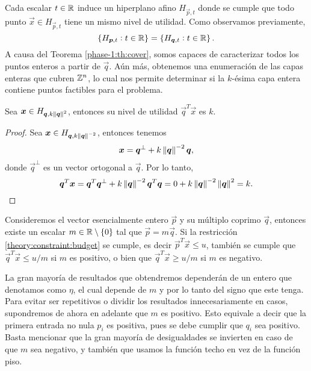 Cada escalar $t \in \mathbb{R}$ induce un hiperplano afino $H_{\vec{p}, t}$ donde se cumple que todo punto
$\vec{x} \in H_{\vec{p}, t}$ tiene un mismo nivel de utilidad. Como observamos previamente,
\begin{equation*}
	\left \lbrace H_{\boldsymbol{p}, t} \vcentcolon t \in \mathbb{R} \right\rbrace
	=
	\left \lbrace H_{\boldsymbol{q}, t} \vcentcolon t \in \mathbb{R} \right\rbrace.
\end{equation*}
A causa del Teorema \ref{phase-1:th:cover}, somos capaces de caracterizar todos los puntos enteros a
partir de $\vec{q}$. Aún más, obtenemos una enumeración de las capas enteras que cubren $\mathbb{Z}^n$, lo
cual nos permite determinar si la $k$-ésima capa entera contiene puntos factibles para el problema.

\begin{lemma}
	\label{theory:lemma:utility}
	Sea $\boldsymbol{x} \in H_{\boldsymbol{q}, k\left\lVert \boldsymbol{q} \right\rVert^2}$, entonces su nivel de utilidad
	$\vec{q}^T\vec{x}$ es $k$.
\end{lemma}
\begin{proof}
	Sea $\boldsymbol{x} \in H_{\boldsymbol{q}, k\left\lVert \boldsymbol{q} \right\rVert^{-2}}$, entonces tenemos
	\begin{equation*}
		\boldsymbol{x} = \boldsymbol{q}^{\perp} + k\left\lVert \boldsymbol{q} \right\rVert^{-2}\boldsymbol{q},
	\end{equation*}
	donde $\vec{q}^{\perp}$ es un vector ortogonal a $\vec{q}$. Por lo tanto,
	\begin{equation*}
		\boldsymbol{q}^T\boldsymbol{x} = \boldsymbol{q}^T\boldsymbol{q}^{\perp} + k\left\lVert \boldsymbol{q} \right\rVert^{-2}\boldsymbol{q}^T\boldsymbol{q}
		= 0 + k \left\lVert \boldsymbol{q} \right\rVert^{-2} \left\lVert \boldsymbol{q} \right\rVert^{2} = k.
	\end{equation*}
\end{proof}

Consideremos el vector esencialmente entero $\vec{p}$ y su múltiplo coprimo $\vec{q}$, entonces
existe un escalar $m \in \mathbb{R} \setminus \lbrace 0 \rbrace$ tal que $\vec{p} = m\vec{q}$. Si la
restricción \eqref{theory:constraint:budget} se cumple, es decir $\vec{p}^T\vec{x} \leq u$, también
se cumple que $\vec{q}^T\vec{x} \leq u/m$ si $m$ es positivo, o bien que $\vec{q}^T\vec{x} \geq u/m$
si $m$ es negativo.

La gran mayoría de resultados que obtendremos dependerán de un entero que denotamos como $\eta$, el
cual depende de $m$ y por lo tanto del signo que este tenga. Para evitar ser repetitivos o dividir
los resultados innecesariamente en casos, supondremos de ahora en adelante que $m$ es positivo. Esto
equivale a decir que la primera entrada no nula $p_i$ es positiva, pues se debe cumplir que $q_i$
sea positivo. Basta mencionar que la gran mayoría de desigualdades se invierten en caso de que $m$
sea negativo, y también que usamos la función techo en vez de la función piso.

